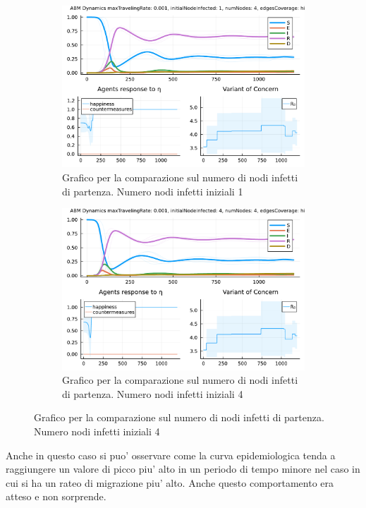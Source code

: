 \begin{figure}[!hb]
	\centering
	\begin{subfigure}[b]{0.45\textwidth}
		\centering
		\includegraphics[width=\textwidth]{img/SocialNetworkABM_1.pdf}
		\caption{Grafico per la comparazione sul numero di nodi infetti di partenza. Numero nodi infetti iniziali 1}
		\label{fig:comparison_init_node_inf_1}
	\end{subfigure}
	\hfill
	\begin{subfigure}[b]{0.45\textwidth}
		\centering
		\includegraphics[width=\textwidth]{img/SocialNetworkABM_13.pdf}
		\caption{Grafico per la comparazione sul numero di nodi infetti di partenza. Numero nodi infetti iniziali 4}
		\label{fig:comparison_init_node_inf_4}
	\end{subfigure}
\end{figure}

Anche in questo caso si puo' osservare come la curva epidemiologica tenda a raggiungere un valore 
di picco piu' alto in un periodo di tempo minore nel caso in cui si ha un rateo di migrazione piu' alto. 
Anche questo comportamento era atteso e non sorprende.

